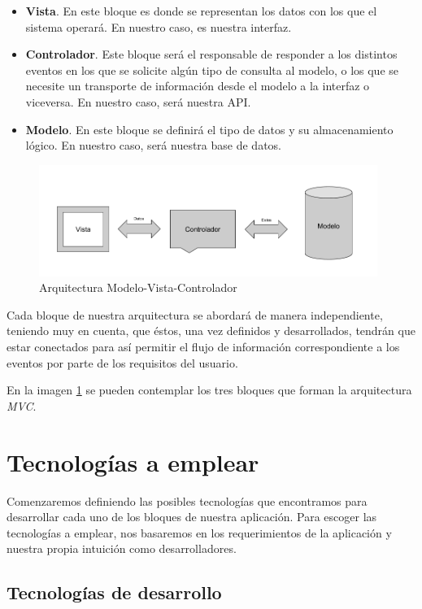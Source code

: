  \begin{itemize}
    \item \textbf{Vista}. En este bloque es donde se representan los datos con los que el sistema operará. En nuestro caso, es nuestra interfaz.
    \item \textbf{Controlador}. Este bloque será el responsable de responder a los distintos eventos en los que se solicite algún tipo de consulta al modelo, o los que se necesite un transporte de información desde el modelo a la interfaz o viceversa. En nuestro caso, será nuestra API.
    \item \textbf{Modelo}. En este bloque se definirá el tipo de datos y su almacenamiento lógico. En nuestro caso, será nuestra base de datos.
\end{itemize}
\begin{figure}[htbp]
    \centerline{\includegraphics[width=11cm]{figuras/mvc.png}}
    \caption{Arquitectura Modelo-Vista-Controlador}
    \label{fig::mvc}
\end{figure}
Cada bloque de nuestra arquitectura se abordará de manera independiente, teniendo muy en cuenta, que éstos, una vez definidos y desarrollados, tendrán que estar conectados para así permitir el flujo de información correspondiente a los eventos por parte de los requisitos del usuario. 

En la imagen \ref{fig::mvc} se pueden contemplar los tres bloques que forman la arquitectura \textit{MVC}.


 
\section{Tecnologías a emplear}

Comenzaremos definiendo las posibles tecnologías que encontramos para desarrollar cada uno de los bloques de nuestra aplicación. Para escoger las tecnologías a emplear, nos basaremos en los requerimientos de la aplicación y nuestra propia intuición como desarrolladores.

\subsection{Tecnologías de desarrollo}

